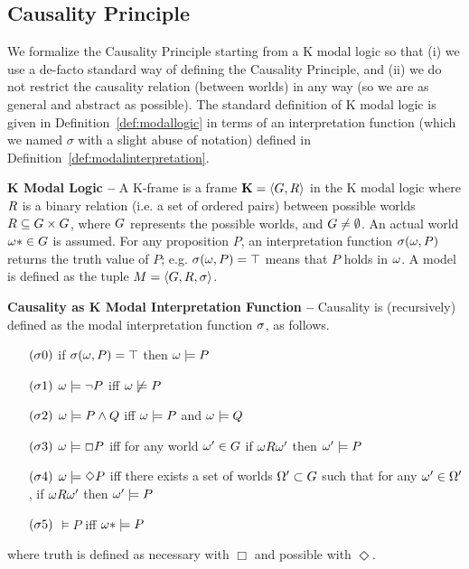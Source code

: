 \subsection{Causality Principle}\label{sec:causality}
We formalize the Causality Principle starting from a K modal
logic\autocite{Garson2018modal} so that (i) we use a de-facto standard
way of defining the Causality Principle, and (ii) we do not restrict the causality
relation (between worlds) in any way (so we are as general and abstract as possible).
The standard definition of K modal logic is given in
Definition~\ref{def:modallogic} in terms of an interpretation function (which
we named $\sigma$ with a slight abuse of notation) defined in
Definition~\ref{def:modalinterpretation}. 
\begin{definition}{\bf K Modal Logic --}\label{def:modallogic}
A K-frame is a frame $ \mathbf{K}=\langle G,R \rangle $
	in the K modal logic where $ R $ is a binary relation
	(i.e. a set of ordered pairs) between possible worlds
	$R\subseteq G\times G$, where
	$G$ represents the possible worlds, and
	$G\neq\emptyset$. An actual world
	$\omega*\in G$ is assumed. For any proposition $P$,
	an interpretation function $\sigma(\omega,P)$ returns the
	truth value of $P$; e.g. $\sigma(\omega,P)=\top$ means that
	$P$ holds in $\omega$. A model is defined as the tuple
	$M=\langle G,R,\sigma\rangle$.
\end{definition}

\begin{definition}{\bf Causality as K Modal Interpretation Function --}\label{def:modalinterpretation}
	Causality is (recursively) defined as the modal interpretation function $\sigma$, as follows. 
	\begin{enumerate}[noitemsep]
		\item[$(\sigma0)$] if $\sigma(\omega,P)=\top$ then $\omega\models P$
		\item[$(\sigma1)$] $\omega\models\neg P$ iff $\omega\not\models P$
		\item[$(\sigma2)$] $\omega\models P \wedge Q$ iff $\omega\models P$ and $\omega\models Q$
		\item[$(\sigma3)$] $\omega\models\Box P$ iff for any world $\omega'\in G$ if $\omega R\omega'$ then $\omega'\models P$
		\item[$(\sigma4)$] $\omega\models\Diamond P$ iff there exists a set of worlds $\Omega'\subset G$ such that for any $\omega'\in\Omega'$, if $\omega R\omega'$ then $\omega'\models P$
		\item[$(\sigma5)$] $\models P$ iff $\omega*\models P$
	\end{enumerate}
	where truth is defined as necessary with $\Box$ and possible with $\Diamond$.
\end{definition}

